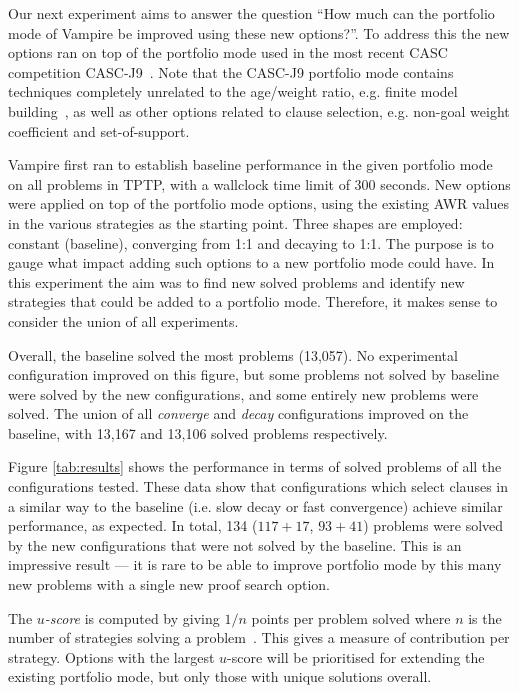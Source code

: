 \documentclass{llncs}
\begin{document}
Our next experiment aims to answer the question ``How much can the portfolio mode of Vampire be improved using these new options?''.
To address this the new options ran on top of the portfolio mode used in the most recent CASC competition CASC-J9~\cite{CASC}.
Note that the CASC-J9 portfolio mode contains techniques completely unrelated to the age/weight ratio, e.g. finite model building~\cite{fmb}, as well as other options related to clause selection, e.g. non-goal weight coefficient and set-of-support.

Vampire first ran to establish baseline performance in the given portfolio mode on all problems in TPTP, with a wallclock time limit of 300 seconds.
New options were applied on top of the portfolio mode options, using the existing AWR values in the various strategies as the starting point.
Three shapes are employed: constant (baseline), converging from 1:1 and decaying to 1:1.
The purpose is to gauge what impact adding such options to a new portfolio mode could have.
In this experiment the aim was to find new solved problems and identify new strategies that could be added to a portfolio mode.
Therefore, it makes sense to consider the union of all experiments.

Overall, the baseline solved the most problems (13,057). 
No experimental configuration improved on this figure, but some problems not solved by baseline were solved by the new configurations, and some entirely new problems were solved.
The union of all \emph{converge} and \emph{decay} configurations improved on the baseline, with 13,167 and 13,106 solved problems respectively.

Figure \ref{tab:results} shows the performance in terms of solved problems of all the configurations tested.
These data show that configurations which select clauses in a similar way to the baseline (i.e. slow decay or fast convergence) achieve similar performance, as expected.
In total, 134 (\(117 + 17\), \(93 + 41\))  problems were solved by the new configurations that were not solved by the baseline. This is an impressive result --- it is rare to be able to improve portfolio mode by this many new problems with a single new proof search option.  

The \emph{\(u\)-score} is computed by giving $1/n$ points per problem solved where $n$ is the number of strategies solving a problem~\cite{u-score}.
This gives a measure of contribution per strategy.
Options with the largest \(u\)-score will be prioritised for extending the existing portfolio mode, but only those with unique solutions overall.
\end{document}

